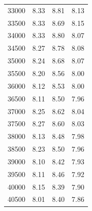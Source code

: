\begin{table}[htbp]
\begin{tabular}{rrrr}
    33000 & 8.33 & 8.81 & 8.13 \\
    33500 & 8.33 & 8.69 & 8.15 \\
    34000 & 8.33 & 8.80 & 8.07 \\
    34500 & 8.27 & 8.78 & 8.08 \\
    35000 & 8.24 & 8.68 & 8.07 \\
    35500 & 8.20 & 8.56 & 8.00 \\
    36000 & 8.12 & 8.53 & 8.00 \\
    36500 & 8.11 & 8.50 & 7.96 \\
    37000 & 8.25 & 8.62 & 8.04 \\
    37500 & 8.27 & 8.60 & 8.03 \\
    38000 & 8.13 & 8.48 & 7.98 \\
    38500 & 8.23 & 8.50 & 7.96 \\
    39000 & 8.10 & 8.42 & 7.93 \\
    39500 & 8.11 & 8.46 & 7.92 \\
    40000 & 8.15 & 8.39 & 7.90 \\
    40500 & 8.01 & 8.40 & 7.86 \\
    \bottomrule
  \end{tabular}
\end{table}
